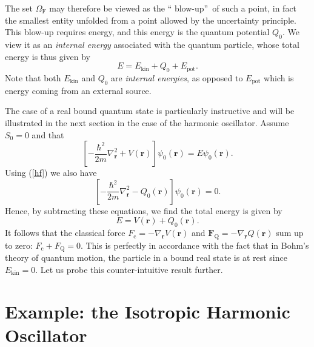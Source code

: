 \documentclass[11pt]{article}%
\begin{document}
The set $\Omega_{\mathrm{F}}$ may therefore be viewed as the \textquotedblleft
blow-up\textquotedblright\ of such a point, in fact the smallest entity
unfolded from a point allowed by the uncertainty principle. This blow-up
requires energy, and this energy is the quantum potential $Q_{0}$. We view it
as an \textit{internal energy} associated with the quantum particle, whose
total energy is thus given by
\begin{equation}
E=E_{\mathrm{kin}}+Q_{0}+E_{\mathrm{pot}}. \label{energy}%
\end{equation}
Note that both $E_{\mathrm{kin}}$ and $Q_{0}$ are \emph{internal energies}, as
opposed to $E_{\mathrm{pot}}$ which is energy coming from an external source.

The case of a real bound quantum state is particularly instructive and will be
illustrated in the next section in the case of the harmonic oscillator. Assume
$S_{0}=0$ and that\
\[
\left[  -\frac{\hbar^{2}}{2m}\nabla_{\mathbf{r}}^{2}+V(\mathbf{r})\right]
\psi_{0}(\mathbf{r})=E\psi_{0}(\mathbf{r}).
\]
Using (\ref{hf}) we also have%
\[
\left[  -\frac{\hbar^{2}}{2m}\nabla_{\mathbf{r}}^{2}-Q_{0}(\mathbf{r})\right]
\psi_{0}(\mathbf{r})=0.
\]
Hence, by subtracting these equations, we find the total energy is given by%
\begin{equation}
E=V(\mathbf{r})+Q_{0}(\mathbf{r}). \label{evq}%
\end{equation}
It follows that the classical force $F_{\mathrm{c}}=-\nabla_{\mathbf{r}%
}V(\mathbf{r})$ and $\mathbf{F}_{\mathrm{Q}}=-\nabla_{\mathbf{r}}%
Q(\mathbf{r})$ sum up to zero: $F_{\mathrm{c}}+F_{\mathrm{Q}}=0$. This is
perfectly in accordance with the fact that in Bohm's theory of quantum motion,
the particle in a bound real state is at rest since $E_{\mathrm{kin}}=0$. Let
us probe this counter-intuitive result further.

\section{Example: the Isotropic Harmonic Oscillator}
\end{document}
